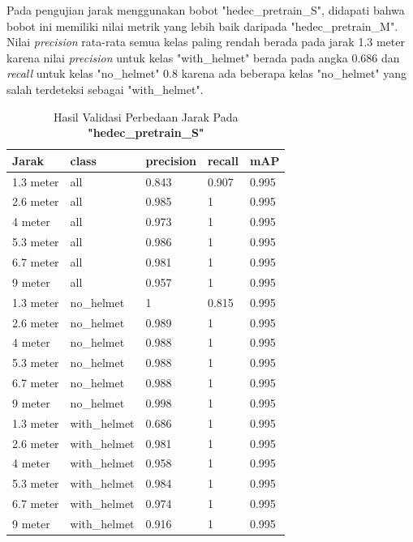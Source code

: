 \begin{enumerate}
  \par Pada pengujian jarak menggunakan bobot "hedec\_pretrain\_S", didapati bahwa bobot ini memiliki nilai metrik
  yang lebih baik daripada "hedec\_pretrain\_M". Nilai \emph{precision} rata-rata semua kelas paling rendah berada pada jarak 1.3 meter karena
  nilai \emph{precision} untuk kelas "with\_helmet" berada pada angka 0.686 dan \emph{recall} untuk kelas "no\_helmet" 0.8 karena ada beberapa 
  kelas "no\_helmet" yang salah terdeteksi sebagai "with\_helmet".

  \newpage
  \begin{longtable}{|l|l|l|l|l|} 
    \caption{Hasil Validasi Perbedaan Jarak Pada \textbf{"hedec\_pretrain\_S"}}
    \label{tb:hasiljarak_hedec_pretrain_S}\\
    \hline
    Jarak     & class        & precision & recall & mAP    \\ 
    \hline
    1.3 meter & all          & 0.843     & 0.907  & 0.995  \\
    2.6 meter & all          & 0.985     & 1      & 0.995  \\
    4 meter   & all          & 0.973     & 1      & 0.995  \\
    5.3 meter & all          & 0.986     & 1      & 0.995  \\
    6.7 meter & all          & 0.981     & 1      & 0.995  \\
    9 meter   & all          & 0.957     & 1      & 0.995  \\
    1.3 meter & no\_helmet   & 1         & 0.815  & 0.995  \\
    2.6 meter & no\_helmet   & 0.989     & 1      & 0.995  \\
    4 meter   & no\_helmet   & 0.988     & 1      & 0.995  \\
    5.3 meter & no\_helmet   & 0.988     & 1      & 0.995  \\
    6.7 meter & no\_helmet   & 0.988     & 1      & 0.995  \\
    9 meter   & no\_helmet   & 0.998     & 1      & 0.995  \\
    1.3 meter & with\_helmet & 0.686     & 1      & 0.995  \\
    2.6 meter & with\_helmet & 0.981     & 1      & 0.995  \\
    4 meter   & with\_helmet & 0.958     & 1      & 0.995  \\
    5.3 meter & with\_helmet & 0.984     & 1      & 0.995  \\
    6.7 meter & with\_helmet & 0.974     & 1      & 0.995  \\
    9 meter   & with\_helmet & 0.916     & 1      & 0.995  \\
    \hline
  \end{longtable}


\end{enumerate}
